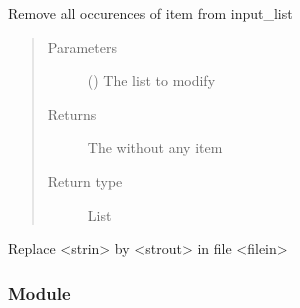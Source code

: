\documentclass[a4paper,10pt,english]{sphinxmanual}
\begin{document}

\begin{fulllineitems}
\label{\detokenize{commands/apidoc/src:src.__init__.read_config_from_a_file}}
\end{fulllineitems}


\begin{fulllineitems}
\label{\detokenize{commands/apidoc/src:src.__init__.remove_item_from_list}}
Remove all occurences of item from input\_list
\begin{quote}\begin{description}
\item[{Parameters}] \leavevmode
{} () \textendash{} The list to modify

\item[{Returns}] \leavevmode
The without any item

\item[{Return type}] \leavevmode
List

\end{description}\end{quote}

\end{fulllineitems}


\begin{fulllineitems}
\label{\detokenize{commands/apidoc/src:src.__init__.replace_in_file}}
Replace \textless{}strin\textgreater{} by \textless{}strout\textgreater{} in file \textless{}filein\textgreater{}

\end{fulllineitems}



\subsubsection{ Module}
\label{\detokenize{commands/apidoc/src:elementtree-module}}\label{\detokenize{commands/apidoc/src:module-src.ElementTree}}
\end{document}
